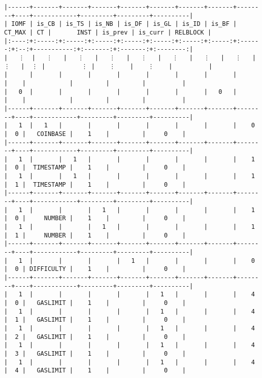 \documentclass[varwidth=\maxdimen,margin=0.5cm,multi={verbatim}]{standalone}
\begin{document}
\begin{verbatim}
|------+-------+-------+-------+-------+-------+-------+-------+--------+----+------------+---------+---------+----------|
| IOMF | is_CB | is_TS | is_NB | is_DF | is_GL | is_ID | is_BF | CT_MAX | CT |       INST | is_prev | is_curr | RELBLOCK |
|:----:+:-----:+:-----:+:-----:+:-----:+:-----:+:-----:+:-----:+:------:+:--:+-----------:+:-------:+:-------:+:--------:|
|   ⋮  |   ⋮   |   ⋮   |   ⋮   |   ⋮   |   ⋮   |   ⋮   |   ⋮   |    ⋮   |  ⋮ |          ⋮ |    ⋮    |    ⋮    |          |
|      |       |       |       |       |       |       |       |        |    |            |         |         |          |
|   0  |       |       |       |       |       |       |   0   |        |    |            |         |         |          |
|------+-------+-------+-------+-------+-------+-------+-------+--------+----+------------+---------+---------+----------|
|   1  |   1   |       |       |       |       |       |       |    0   |  0 |   COINBASE |    1    |         |     0    |
|------+-------+-------+-------+-------+-------+-------+-------+--------+----+------------+---------+---------+----------|
|   1  |       |   1   |       |       |       |       |       |    1   |  0 |  TIMESTAMP |    1    |         |     0    |
|   1  |       |   1   |       |       |       |       |       |    1   |  1 |  TIMESTAMP |    1    |         |     0    |
|------+-------+-------+-------+-------+-------+-------+-------+--------+----+------------+---------+---------+----------|
|   1  |       |       |   1   |       |       |       |       |    1   |  0 |     NUMBER |    1    |         |     0    |
|   1  |       |       |   1   |       |       |       |       |    1   |  1 |     NUMBER |    1    |         |     0    |
|------+-------+-------+-------+-------+-------+-------+-------+--------+----+------------+---------+---------+----------|
|   1  |       |       |       |   1   |       |       |       |    0   |  0 | DIFFICULTY |    1    |         |     0    |
|------+-------+-------+-------+-------+-------+-------+-------+--------+----+------------+---------+---------+----------|
|   1  |       |       |       |       |   1   |       |       |    4   |  0 |   GASLIMIT |    1    |         |     0    |
|   1  |       |       |       |       |   1   |       |       |    4   |  1 |   GASLIMIT |    1    |         |     0    |
|   1  |       |       |       |       |   1   |       |       |    4   |  2 |   GASLIMIT |    1    |         |     0    |
|   1  |       |       |       |       |   1   |       |       |    4   |  3 |   GASLIMIT |    1    |         |     0    |
|   1  |       |       |       |       |   1   |       |       |    4   |  4 |   GASLIMIT |    1    |         |     0    |

\end{verbatim}
\end{document}
